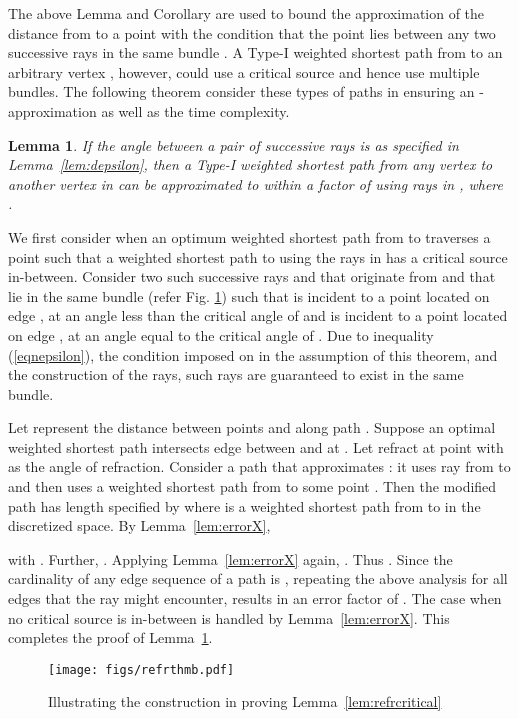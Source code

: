 \documentclass[11pt]{article}
\newtheorem{lemma}{Lemma}[section]
\newenvironment{proof}{\par\noindent{\bf Proof:}}{\mbox{}\hfill\\}
\begin{document}
The above Lemma and Corollary are used to bound the approximation of the distance from  to a point with the condition that the point lies between any two successive rays in the same  bundle .
A Type-I weighted shortest path from  to an arbitrary vertex , however, could use a critical source and hence use multiple bundles.
The following theorem consider these types of paths in ensuring an -approximation as well as the time complexity. 

\begin{lemma}
\label{lem:refrnoncritical}
If the angle between a pair of successive rays is as specified in Lemma~\ref{lem:depsilon}, then a Type-I weighted shortest path from any vertex  to another vertex  in  can be approximated to within a factor of  using rays in , where .
\end{lemma}
\begin{proof}
We first consider when an optimum weighted shortest path from  to  traverses a point  such that a weighted shortest path to  using the rays in  has a critical source  in-between.
Consider two such successive rays  and  that originate from  and that lie
in the same bundle  (refer Fig. \ref{fig:refrthmb}) such that
  is incident to a point  located on edge , at an angle less than the critical angle of 
and   is incident to a point  located on edge , at an angle equal to the critical angle of .  
Due to inequality (\ref{eqnepsilon}), the condition imposed on  in the assumption of this theorem, and the construction of the rays, such rays are guaranteed to exist in the same bundle.

Let  represent the distance between points  and  along path . 
Suppose an optimal weighted shortest path  intersects edge  between  and  at .
Let  refract at point  with  as the angle of refraction. 
Consider a path  that approximates : it uses ray  from  to  and then uses a weighted shortest path from  to some point . Then the modified path has length specified by  where  is a weighted shortest path from  to  in the discretized space.
By Lemma~\ref{lem:errorX},

with .
Further, .
Applying  Lemma~\ref{lem:errorX} again, 
 .
Thus .
Since the cardinality of any edge sequence of a path is  ,
repeating the above analysis for all edges that the ray might encounter,
results in an error factor of .
The case when no critical source is in-between is handled by  Lemma~\ref{lem:errorX}.
This completes the proof of Lemma~\ref{lem:refrnoncritical}.
\begin{figure}[h]
\begin{minipage}[t]{\linewidth}
\begin{center}
\texttt{[image: figs/refrthmb.pdf]}
\caption{\footnotesize Illustrating the construction in proving Lemma~\ref{lem:refrcritical} }
\label{fig:refrthmb}
\end{center}
\end{minipage}
\vspace*{-0.1in}
\end{figure}
\end{proof}
\end{document}

